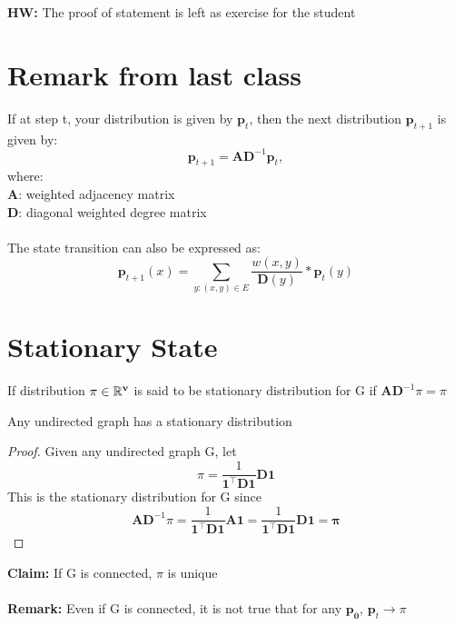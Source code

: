 \documentclass[11pt]{article}
\begin{document}
\newcommand{\coursenum}{{CSC 2421H}}
\newcommand{\coursename}{{Graphs, Matrices, and Optimization}}
\newcommand{\courseprof}{Sushant Sachdeva}

\textbf{HW:} The proof of statement is left as exercise for the student
\section{Remark from last class}
\label{sec:goal}

If at step t, your distribution is given by $\mathbf{p}_{t}$, then the next distribution $\mathbf{p}_{t+1}$ is given by: 
\begin{equation}
    \mathbf{p}_{t+1} = \mathbf{AD}^{-1}\mathbf{p}_{t},
\end{equation}
where:\\
\textbf{A}: weighted adjacency matrix\\
\textbf{D}: diagonal weighted degree matrix\\\\
The state transition can also be expressed as:
\begin{equation*}
    \mathbf{p}_{t+1}(x) = \sum_{y:(x,y) \in E} \frac{w(x,y)}{\mathbf{D}(y)}*\mathbf{p}_{t}(y)
\end{equation*}

\section{Stationary State}
\begin{definition}
    If distribution $\mathbf{\pi \in \mathbb R^v}$ is said to be stationary distribution for G if $\mathbf{AD}^{-1}\pi = \pi$ 
\end{definition}

\begin{lemma}
Any undirected graph has a stationary distribution
\end{lemma}

\begin{proof}
Given any undirected graph G, let
\begin{equation*}
    \pi = \frac{1}{\mathbf{1^\top D1}}\mathbf{D1}
\end{equation*}
This is the stationary distribution for G since
\begin{equation*}
    \mathbf{AD}^{-1}\pi = \frac{1}{\mathbf{1^\top D1}}\mathbf{A1} = \frac{1}{\mathbf{1^\top D1}}\mathbf{D1 = \pi}
\end{equation*}
\end{proof}
\textbf{Claim:}
If G is connected, $\pi$ is unique\\\\
\textbf{Remark:}
Even if G is connected, it is not true that for any $\mathbf{p_0}$, $\mathbf{p}_t \rightarrow \pi$\\
\end{document}
